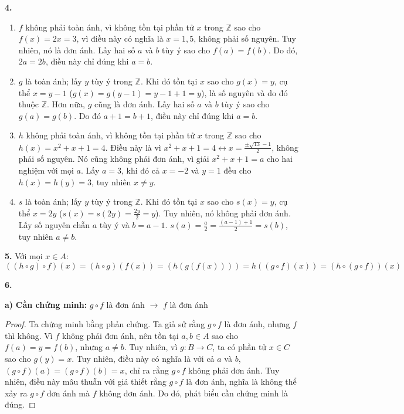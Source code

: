 \documentclass[12pt,a4paper]{article}
\theoremstyle{definition}
\begin{document}
\bigskip
\textbf{4.}
\begin{enumerate}[label=\textbf{\alph*)}]
\item $f$ không phải toàn ánh, vì không tồn tại phần tử $x$ trong $\mathbb{Z}$ sao cho $f(x) = 2x = 3$, vì điều này có nghĩa là $x = 1{,}5$, không phải số nguyên. Tuy nhiên, nó là đơn ánh. Lấy hai số $a$ và $b$ tùy ý sao cho $f(a) = f(b)$. Do đó, $2a = 2b$, điều này chỉ đúng khi $a = b$.

\item $g$ là toàn ánh; lấy $y$ tùy ý trong $\mathbb{Z}$. Khi đó tồn tại $x$ sao cho $g(x) = y$, cụ thể $x = y - 1$ ($g(x) = g(y-1) = y - 1 + 1 = y$), là số nguyên và do đó thuộc $\mathbb{Z}$. Hơn nữa, $g$ cũng là đơn ánh. Lấy hai số $a$ và $b$ tùy ý sao cho $g(a) = g(b)$. Do đó $a + 1 = b + 1$, điều này chỉ đúng khi $a = b$.

\item $h$ không phải toàn ánh, vì không tồn tại phần tử $x$ trong $\mathbb{Z}$ sao cho $h(x) = x^2 + x + 1 = 4$. Điều này là vì $x^2 + x + 1 = 4 \leftrightarrow x = \frac{\pm\sqrt{13} - 1}{2}$, không phải số nguyên. Nó cũng không phải đơn ánh, vì giải $x^2 + x + 1 = a$ cho hai nghiệm với mọi $a$. Lấy $a = 3$, khi đó cả $x = -2$ và $y = 1$ đều cho $h(x) = h(y) = 3$, tuy nhiên $x \neq y$.

\item $s$ là toàn ánh; lấy $y$ tùy ý trong $\mathbb{Z}$. Khi đó tồn tại $x$ sao cho $s(x) = y$, cụ thể $x = 2y$ ($s(x) = s(2y) = \frac{2y}{2} = y$). Tuy nhiên, nó không phải đơn ánh. Lấy số nguyên chẵn $a$ tùy ý và $b = a - 1$. $s(a) = \frac{a}{2} = \frac{(a-1)+1}{2} = s(b)$, tuy nhiên $a \neq b$.
\end{enumerate}

\bigskip
\textbf{5.} Với mọi $x \in A$:
\[((h \circ g) \circ f)(x) = (h \circ g)(f(x)) = (h(g(f(x)))) = h((g \circ f)(x)) = (h \circ (g \circ f))(x)\]

\bigskip
\textbf{6.}

\textbf{a)} \textbf{Cần chứng minh:} $g \circ f$ là đơn ánh $\to$ $f$ là đơn ánh

\begin{proof}
Ta chứng minh bằng phản chứng. Ta giả sử rằng $g \circ f$ là đơn ánh, nhưng $f$ thì không. Vì $f$ không phải đơn ánh, nên tồn tại $a, b \in A$ sao cho $f(a) = y = f(b)$, nhưng $a \neq b$. Tuy nhiên, vì $g : B \to C$, ta có phần tử $x \in C$ sao cho $g(y) = x$. Tuy nhiên, điều này có nghĩa là với cả $a$ và $b$, $(g \circ f)(a) = (g \circ f)(b) = x$, chỉ ra rằng $g \circ f$ không phải đơn ánh. Tuy nhiên, điều này mâu thuẫn với giả thiết rằng $g \circ f$ là đơn ánh, nghĩa là không thể xảy ra $g \circ f$ đơn ánh mà $f$ không đơn ánh. Do đó, phát biểu cần chứng minh là đúng.
\end{proof}
\end{document}
